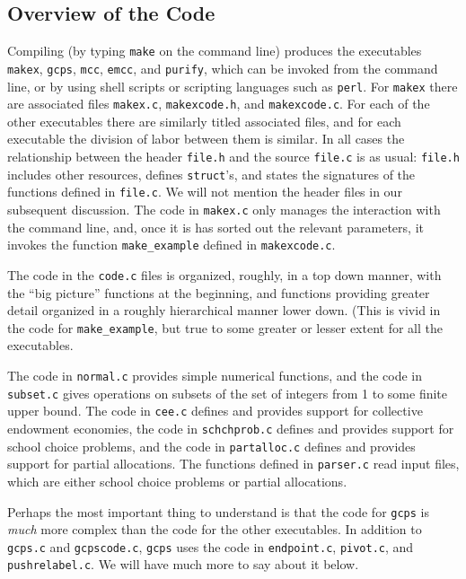 \documentclass[12pt]{article}
\theoremstyle{definition}
\begin{document}
\begin{appendix}
\subsection{Overview of the Code}

Compiling (by typing \texttt{make} on the command line) produces the
executables \texttt{makex}, \texttt{gcps}, \texttt{mcc},
\texttt{emcc}, and \texttt{purify}, which can be invoked from the
command line, or by using shell scripts or scripting languages such as
\texttt{perl}.  For \texttt{makex} there are associated files
\texttt{makex.c}, \texttt{makexcode.h}, and \texttt{makexcode.c}.  For
each of the other executables there are similarly titled associated
files, and for each executable the division of labor between them is
similar.  In all cases the relationship between the header
\texttt{file.h} and the source \texttt{file.c} is as usual:
\texttt{file.h} includes other resources, defines \texttt{struct}'s,
and states the signatures of the functions defined in
\texttt{file.c}. We will not mention the header files in our
subsequent discussion.  The code in \texttt{makex.c} only manages the
interaction with the command line, and, once it is has sorted out the
relevant parameters, it invokes the function \texttt{make\_example}
defined in \texttt{makexcode.c}.

The code in the \texttt{code.c} files is organized, roughly, in a top
down manner, with the ``big picture'' functions at the beginning, and
functions providing greater detail organized in a roughly hierarchical
manner lower down.  (This is vivid in the code for
\texttt{make\_example}, but true to some greater or lesser extent for
all the executables.

The code in \texttt{normal.c} provides simple numerical functions, and
the code in \texttt{subset.c} gives operations on subsets of the set
of integers from 1 to some finite upper bound.  The code in
\texttt{cee.c} defines and provides support for collective endowment
economies, the code in \texttt{schchprob.c} defines and provides
support for school choice problems, and the code in
\texttt{partalloc.c} defines and provides support for partial
allocations.  The functions defined in \texttt{parser.c} read input
files, which are either school choice problems or partial allocations.

Perhaps the most important thing to understand is that the code for
\texttt{gcps} is \emph{much} more complex than the code for the other
executables.  In addition to \texttt{gcps.c} and \texttt{gcpscode.c},
\texttt{gcps} uses the code in \texttt{endpoint.c}, \texttt{pivot.c},
and \texttt{pushrelabel.c}.  We will have much more to say about it
below.


\end{appendix}
\end{document}
